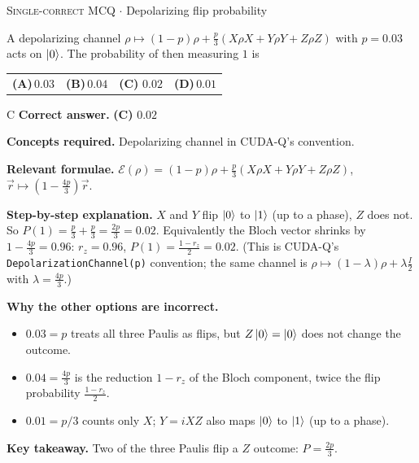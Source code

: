 \documentclass[11pt,a4paper]{article}
\newcommand{\optlabel}[1]{\textbf{(#1)}}
\newcommand{\correctlabel}[1]{\textcolor{okgreen}{\textbf{(#1)}\,\ding{51}}}
\newenvironment{qitem}[1]{\begin{list}{}{\setlength{\leftmargin}{3.3em}\setlength{\labelwidth}{3.1em}%
  \setlength{\labelsep}{0.2em}\setlength{\topsep}{3pt}\setlength{\parsep}{3pt}}\item[\textbf{Q.#1}\hfill]}{\end{list}}
\newcommand{\qsep}{\par\vspace{2pt}{\color{black!15}\hrule}\vspace{4pt}}
\newcommand{\qmeta}[2]{{\footnotesize\color{black!60}\textsc{#1} \;$\cdot$\; #2}\par}
\begin{document}
\begin{qitem}{23}
\qmeta{Single-correct MCQ}{Depolarizing flip probability}
A depolarizing channel $\rho \mapsto (1 - p)\rho + \frac p3(X\rho X + Y\rho Y + Z\rho Z)$ with $p = 0.03$ acts on $\ket0$. The probability of
then measuring $1$ is
\par\smallskip\noindent\begin{tabularx}{\linewidth}{@{}*{4}{L}@{}}
\optlabel{A}\,$0.03$ & \optlabel{B}\,$0.04$ & \correctlabel{C}\,$0.02$ & \optlabel{D}\,$0.01$
\end{tabularx}
\end{qitem}
\begin{solbox}{C}
\textbf{\color{brand}Correct answer.} \textcolor{okgreen}{\textbf{(C)}} $0.02$

\textbf{\color{brand}Concepts required.} Depolarizing channel in CUDA-Q's convention.

\textbf{\color{brand}Relevant formulae.} $\mathcal E(\rho) = (1-p)\rho + \frac p3(X\rho X + Y\rho Y + Z\rho Z)$, $\vec r \mapsto (1 - \frac{4p}{3})\vec r$.

\textbf{\color{brand}Step-by-step explanation.} $X$ and $Y$ flip $\ket0$ to $\ket1$ (up to a phase), $Z$ does not. So $P(1) = \frac p3 + \frac p3 = \frac{2p}{3} = 0.02$.
Equivalently the Bloch vector shrinks by $1 - \frac{4p}{3} = 0.96$: $r_z = 0.96$, $P(1) = \frac{1 - r_z}{2} = 0.02$.
(This is CUDA-Q's \texttt{DepolarizationChannel(p)} convention; the same channel is $\rho \mapsto (1 - \lambda)\rho + \lambda\frac I2$ with $\lambda = \frac{4p}{3}$.)

\textbf{\color{brand}Why the other options are incorrect.}
\begin{itemize}[leftmargin=2.4em, itemsep=1pt, topsep=2pt]
\item[\textbf{(A)}] $0.03 = p$ treats all three Paulis as flips, but $Z\ket0 = \ket0$ does not change the outcome.
\item[\textbf{(B)}] $0.04 = \frac{4p}{3}$ is the reduction $1 - r_z$ of the Bloch component, twice the flip probability $\frac{1 - r_z}{2}$.
\item[\textbf{(D)}] $0.01 = p/3$ counts only $X$; $Y = iXZ$ also maps $\ket0$ to $\ket1$ (up to a phase).
\end{itemize}
\textbf{\color{brand}Key takeaway.} Two of the three Paulis flip a $Z$ outcome: $P = \frac{2p}{3}$.
\end{solbox}
\qsep
\end{document}
